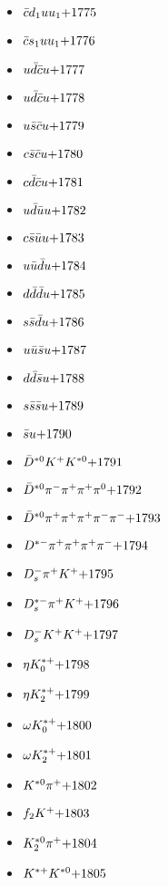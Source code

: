 \begin{multicols}{3}
\begin{itemize}
 \item $ \bar{c}d_{1} uu_{1} \hfill{+1775}$
 \item $ \bar{c}s_{1} uu_{1} \hfill{+1776}$
 \item $ u \bar{d} \bar{c} u \hfill{+1777}$
 \item $ u \bar{d} \bar{c} u \hfill{+1778}$
 \item $ u \bar{s} \bar{c} u \hfill{+1779}$
 \item $ c \bar{s} \bar{c} u \hfill{+1780}$
 \item $ c \bar{d} \bar{c} u \hfill{+1781}$
 \item $ u \bar{d} \bar{u} u \hfill{+1782}$
 \item $ c \bar{s} \bar{u} u \hfill{+1783}$
 \item $ u \bar{u} \bar{d} u \hfill{+1784}$
 \item $ d \bar{d} \bar{d} u \hfill{+1785}$
 \item $ s \bar{s} \bar{d} u \hfill{+1786}$
 \item $ u \bar{u} \bar{s} u \hfill{+1787}$
 \item $ d \bar{d} \bar{s} u \hfill{+1788}$
 \item $ s \bar{s} \bar{s} u \hfill{+1789}$
 \item $ \bar{s} u \hfill{+1790}$
 \item $ \bar{D}^{*0} K^{+} K^{*0} \hfill{+1791}$
 \item $ \bar{D}^{*0} \pi^{-} \pi^{+} \pi^{+} \pi^{0} \hfill{+1792}$
 \item $ \bar{D}^{*0} \pi^{+} \pi^{+} \pi^{+} \pi^{-} \pi^{-} \hfill{+1793}$
 \item $ D^{*-} \pi^{+} \pi^{+} \pi^{+} \pi^{-} \hfill{+1794}$
 \item $ D_{s}^{-} \pi^{+} K^{+} \hfill{+1795}$
 \item $ D_{s}^{*-} \pi^{+} K^{+} \hfill{+1796}$
 \item $ D_{s}^{-} K^{+} K^{+} \hfill{+1797}$
 \item $ \eta K_{0}^{*+} \hfill{+1798}$
 \item $ \eta K_{2}^{*+} \hfill{+1799}$
 \item $ \omega K_{0}^{*+} \hfill{+1800}$
 \item $ \omega K_{2}^{*+} \hfill{+1801}$
 \item $ K^{*0} \pi^{+} \hfill{+1802}$
 \item $ f_{2} K^{+} \hfill{+1803}$
 \item $ K_{2}^{*0} \pi^{+} \hfill{+1804}$
 \item $ K^{*+} K^{*0} \hfill{+1805}$

\end{itemize}
\end{multicols}
